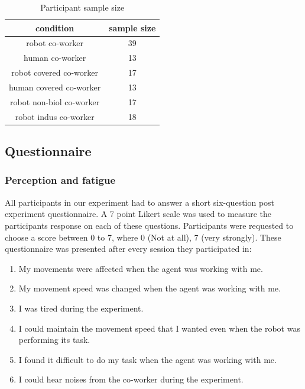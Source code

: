 \begin{table}[hpt]
	\caption{Participant sample size}
	\label{sizeTable}
	\begin{center}
		\begin{tabular}{|c c|}
			\hline  
			{\bf condition} &  {\bf sample size} \\ 
			\hline
			robot co-worker & 39 \\ 
			\hline
			human co-worker & 13 \\
			\hline
			robot covered co-worker & 17 \\
			\hline
			human covered co-worker & 13 \\
			\hline
			robot non-biol co-worker & 17 \\
			\hline
			robot indus co-worker & 18 \\
			\hline 			
		\end{tabular} 
	\end{center}
\end{table}


\subsection{Questionnaire}

\subsubsection{Perception and fatigue}

All participants in our experiment had to answer a short six-question post experiment questionnaire. A 7 point Likert scale was used to measure the participants response on each of these questions. Participants were requested to choose a score between 0 to 7, where 0 (Not at all), 7 (very strongly). These questionnaire was presented after every session they participated in:

\begin{enumerate}[start=1,label={Q\arabic*.}]
	\item My movements were affected when the agent was working with me.
	\item My movement speed was changed when the agent was working with me.
	\item I was tired during the experiment.
	\item I could maintain the movement speed that I wanted even when the robot was performing its task.
	\item I found it difficult to do my task when the agent was working with me.
	\item I could hear noises from the co-worker during the experiment.
\end{enumerate}

